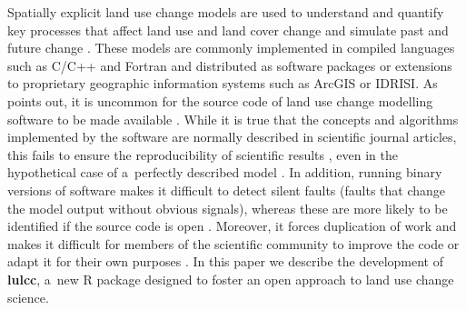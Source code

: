 \documentclass[gmdd, online, hvmath]{copernicus}
\begin{document}
Spatially explicit land use change models are used to understand and quantify key processes that affect land use and land cover change and simulate past and future change \citep{veldkamp2001,mas2014}. These models are commonly implemented in compiled languages such as C/C++ and Fortran and distributed as software packages or extensions to proprietary geographic information systems such as ArcGIS or IDRISI. As \citet{rosa2014} points out, it is uncommon for the source code of land use change modelling software to be made available \citep[e.g.][]{verburg2002,soares-filho2002,verburg2009,schaldach2011}. While it is true that the concepts and algorithms implemented by the software are normally described in scientific journal articles, this fails to ensure the reproducibility of scientific results \citep{peng2011,morin2012}, even in the hypothetical case of a~perfectly described model \citep{ince2012}. In addition, running binary versions of software makes it difficult to detect silent faults (faults that change the model output without obvious signals), whereas these are more likely to be identified if the source code is open \citep{cai2012}. Moreover, it forces duplication of work and makes it difficult for members of the scientific community to improve the code or adapt it for their own purposes \citep{morin2012,pebesma2012,steiniger2013}. In this paper we describe the development of \textbf{lulcc}, a~new R package designed to foster an open approach to land use change science. \\
\end{document}
